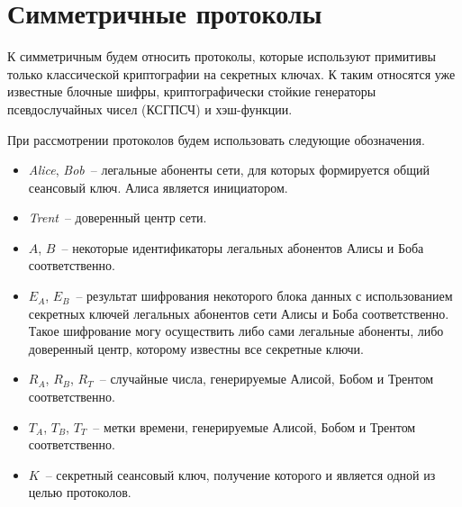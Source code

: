 \section{Симметричные протоколы}

К симметричным будем относить протоколы, которые используют примитивы только классической криптографии на секретных ключах. К таким относятся уже известные блочные шифры, криптографически стойкие генераторы псевдослучайных чисел (КСГПСЧ) и хэш-функции.

При рассмотрении протоколов будем использовать следующие обозначения.
\begin{itemize}
	\item \textit{Alice}, \textit{Bob}~-- легальные абоненты сети, для которых формируется общий сеансовый ключ. Алиса является инициатором.
	\item \textit{Trent}~-- доверенный центр сети.
	\item $A$, $B$~-- некоторые идентификаторы легальных абонентов Алисы и Боба соответственно.
	\item $E_A$, $E_B$~-- результат шифрования некоторого блока данных с использованием секретных ключей легальных абонентов сети Алисы и Боба соответственно. Такое шифрование могу осуществить либо сами легальные абоненты, либо доверенный центр, которому известны все секретные ключи.
	\item $R_A$, $R_B$, $R_T$~-- случайные числа, генерируемые Алисой, Бобом и Трентом соответственно.
	\item $T_A$, $T_B$, $T_T$~-- метки времени, генерируемые Алисой, Бобом и Трентом соответственно.
	\item $K$~-- секретный сеансовый ключ, получение которого и является одной из целью протоколов.
\end{itemize}






